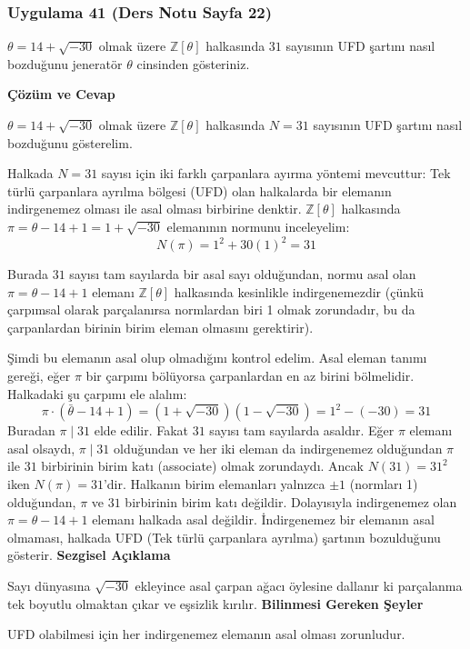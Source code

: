 \documentclass[11pt, a4paper]{article}
\newenvironment{cozum}{
    \vspace{0.5cm}
    \noindent\textcolor{green!60!black}{\faCheckCircle\enspace \textbf{\Large Çözüm ve Cevap}}\par\vspace{0.2cm}
}{}
\newenvironment{sezgisel}{
    \vspace{0.5cm}
    \noindent\textcolor{orange!80!black}{\faLightbulb\enspace \textbf{\Large Sezgisel Açıklama}}\par\vspace{0.2cm}
    \itshape
}{}
\newenvironment{bilgi}{
    \vspace{0.5cm}
    \noindent\textcolor{red!70!black}{\faExclamationTriangle\enspace \textbf{\Large Bilinmesi Gereken Şeyler}}\par\vspace{0.2cm}
}{}
\begin{document}
\subsubsection{Uygulama 41 (Ders Notu Sayfa 22)}
\begin{sorubox}
$\theta = 14 + \sqrt{-30}$ olmak üzere $\mathbb{Z}[\theta]$ halkasında $31$ sayısının UFD şartını nasıl bozduğunu jeneratör $\theta$ cinsinden gösteriniz.
\end{sorubox}
\begin{cozum}
$\theta = 14 + \sqrt{-30}$ olmak üzere $\mathbb{Z}[\theta]$ halkasında $N = 31$ sayısının UFD şartını nasıl bozduğunu gösterelim.

Halkada $N = 31$ sayısı için iki farklı çarpanlara ayırma yöntemi mevcuttur:
Tek türlü çarpanlara ayrılma bölgesi (UFD) olan halkalarda bir elemanın indirgenemez olması ile asal olması birbirine denktir. $\mathbb{Z}[\theta]$ halkasında $\pi = \theta - 14 + 1 = 1+\sqrt{-30}$ elemanının normunu inceleyelim:
\[ N(\pi) = 1^2 + 30(1)^2 = 31 \]

Burada $31$ sayısı tam sayılarda bir asal sayı olduğundan, normu asal olan $\pi = \theta - 14 + 1$ elemanı $\mathbb{Z}[\theta]$ halkasında kesinlikle indirgenemezdir (çünkü çarpımsal olarak parçalanırsa normlardan biri 1 olmak zorundadır, bu da çarpanlardan birinin birim eleman olmasını gerektirir).

Şimdi bu elemanın asal olup olmadığını kontrol edelim. Asal eleman tanımı gereği, eğer $\pi$ bir çarpımı bölüyorsa çarpanlardan en az birini bölmelidir. Halkadaki şu çarpımı ele alalım:
\[ \pi \cdot (\bar{\theta} - 14 + 1) = (1+\sqrt{-30})(1-\sqrt{-30}) = 1^2 - (-30) = 31 \]
Buradan $\pi \mid 31$ elde edilir. Fakat $31$ sayısı tam sayılarda asaldır. Eğer $\pi$ elemanı asal olsaydı, $\pi \mid 31$ olduğundan ve her iki eleman da indirgenemez olduğundan $\pi$ ile $31$ birbirinin birim katı (associate) olmak zorundaydı. Ancak $N(31) = 31^2$ iken $N(\pi) = 31$'dir. Halkanın birim elemanları yalnızca $\pm 1$ (normları 1) olduğundan, $\pi$ ve $31$ birbirinin birim katı değildir. Dolayısıyla indirgenemez olan $\pi = \theta - 14 + 1$ elemanı halkada asal değildir. İndirgenemez bir elemanın asal olmaması, halkada UFD (Tek türlü çarpanlara ayrılma) şartının bozulduğunu gösterir.
\end{cozum}
\begin{sezgisel}
Sayı dünyasına $\sqrt{-30}$ ekleyince asal çarpan ağacı öylesine dallanır ki parçalanma tek boyutlu olmaktan çıkar ve eşsizlik kırılır.
\end{sezgisel}
\begin{bilgi}
UFD olabilmesi için her indirgenemez elemanın asal olması zorunludur.
\end{bilgi}
\end{document}
